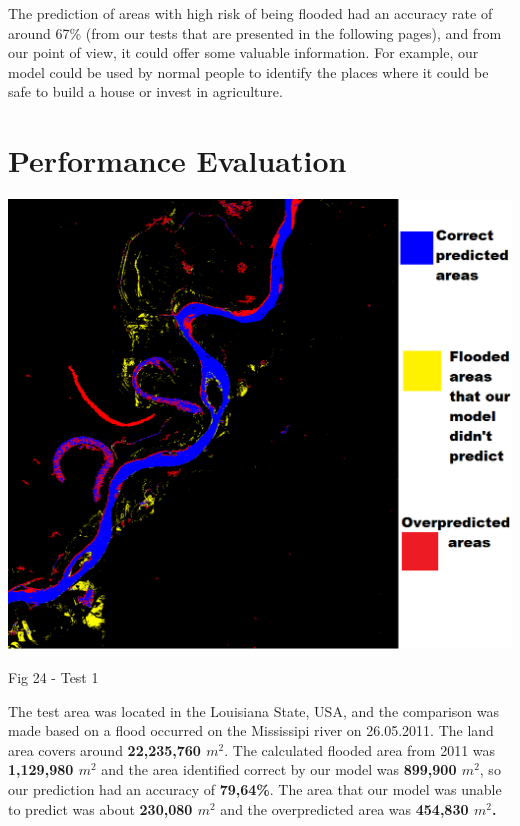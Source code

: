 \documentclass[12pt, a4paper]{report}
\begin{document}
The prediction of areas with high risk of being flooded had an accuracy rate of around 67\% (from our tests that are presented in the following pages), and from our point of view, it could offer some valuable information. For example, our model could be used by normal people to identify the places where it could be safe to build a house or invest in agriculture.

\newpage

\section{Performance Evaluation} 

\bigskip
\includegraphics[scale=0.6, center]{test_1.png}
\begin{center}
Fig 24 - Test 1
\end{center}
\par 

The test area was located in the Louisiana State, USA, and the comparison was made based on a flood occurred on the Mississipi river on 26.05.2011. The land area covers around \textbf{22,235,760 $m^2$}. The calculated flooded area from 2011 was \textbf{1,129,980 $m^2$} and the area identified correct by our model was \textbf{899,900 $m^2$}, so our prediction had an accuracy of \textbf{79,64\%}. The area that our model was unable to predict was about \textbf{230,080 $m^2$} and the overpredicted area was \textbf{454,830 $m^2$.}
\end{document}
